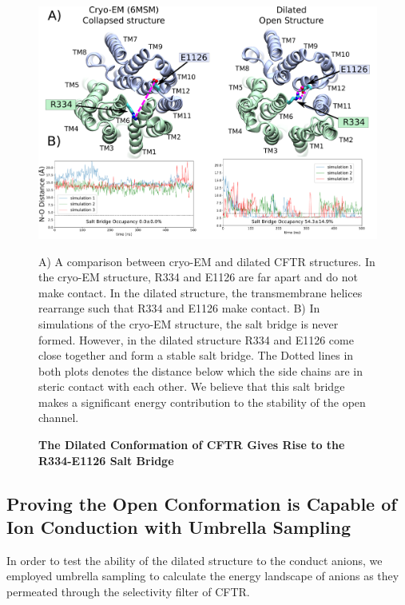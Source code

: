 \begin{figure}
	\begin{center}
		\includegraphics[width=1\textwidth]{figures/opening/salt_bridge_E1126_R334_figure.pdf}
	\end{center}
	\captionsetup{singlelinecheck = false, justification=raggedright}
	\caption[The Dilated Conformation of CFTR Gives Rise to the R334-E1126 Salt Bridge] {\textbf{The Dilated Conformation of CFTR Gives Rise to the R334-E1126 Salt Bridge}}{A) A comparison between cryo-EM and dilated CFTR structures. In the cryo-EM structure, R334 and E1126 are far apart and do not make contact. In the dilated structure, the transmembrane helices rearrange such that R334 and E1126 make contact. B) In simulations of the cryo-EM structure, the salt bridge is never formed. However, in the dilated structure R334 and E1126 come close together and form a stable salt bridge. The Dotted lines in both plots denotes the distance below which the side chains are in steric contact with each other. We believe that this salt bridge makes a significant energy contribution to the stability of the open channel. }
	\label{salt_bridge_fig}
\end{figure}

\subsection{Proving the Open Conformation is Capable of Ion Conduction with Umbrella Sampling}

In order to test the ability of the dilated structure to the conduct anions, we employed umbrella sampling to calculate the energy landscape of anions as they permeated through the selectivity filter of CFTR. 

